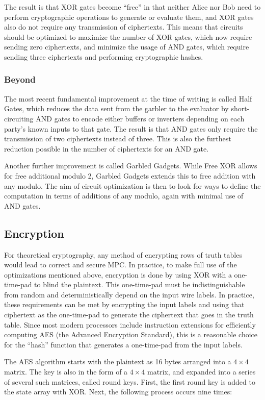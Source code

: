 The result is that XOR gates become ``free'' in that neither Alice nor Bob need to perform cryptographic operations to generate or evaluate them, and XOR gates also do not require any transmission of ciphertexts. This means that circuits should be optimized to maximize the number of XOR gates, which now require sending zero ciphertexts, and minimize the usage of AND gates, which require sending three ciphertexts and performing cryptographic hashes.

\subsubsection{Beyond}
The most recent fundamental improvement at the time of writing is called Half Gates\cite{HalfGates}, which reduces the data sent from the garbler to the evaluator by short-circuiting AND gates to encode either buffers or inverters depending on each party's known inputs to that gate. The result is that AND gates only require the transmission of two ciphertexts instead of three. This is also the furthest reduction possible in the number of ciphertexts for an AND gate\cite{HalfGates}.

Another further improvement is called Garbled Gadgets. While Free XOR allows for free additional modulo 2, Garbled Gadgets extends this to free addition with any modulo\cite{gentle}. The aim of circuit optimization is then to look for ways to define the computation in terms of additions of any modulo, again with minimal use of AND gates.

\subsection{Encryption}
For theoretical cryptography, any method of encrypting rows of truth tables would lead to correct and secure MPC. In practice, to make full use of the optimizations mentioned above, encryption is done by using XOR with a one-time-pad to blind the plaintext. This one-time-pad must be indistinguishable from random and deterministically depend on the input wire labels. In practice, these requirements can be met by encrypting the input labels and using that ciphertext as the one-time-pad to generate the ciphertext that goes in the truth table. Since most modern processors include instruction extensions for efficiently computing AES (the Advanced Encryption Standard), this is a reasonable choice for the ``hash'' function that generates a one-time-pad from the input labels.

The AES algorithm starts with the plaintext as 16 bytes arranged into a $4\times4$ matrix. The key is also in the form of a $4\times4$ matrix, and expanded into a series of several such matrices, called round keys. First, the first round key is added to the state array with XOR. Next, the following process occurs nine times:


